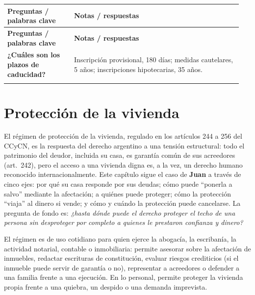 \documentclass[12pt,oneside]{book}
\makeatletter
\newenvironment{cornell}{%
    \par\vspace{0.5em}
    \noindent
    \begin{longtable}{@{}>{\raggedright\arraybackslash}p{0.27\linewidth}
                         >{\raggedright\arraybackslash}p{0.68\linewidth}@{}}
    \toprule
    \textbf{Preguntas / palabras clave} & \textbf{Notas / respuestas} \\
    \midrule
    \endfirsthead
    \toprule
    \textbf{Preguntas / palabras clave} & \textbf{Notas / respuestas} \\
    \midrule
    \endhead
}{%
    \bottomrule
    \end{longtable}
}
\newcommand{\cornellsummary}[1]{%
    \midrule
    \multicolumn{2}{@{}p{\dimexpr0.95\linewidth+2\tabcolsep\relax}@{}}{%
        \vspace{0.2em}\textbf{Resumen:} #1\vspace{0.2em}} \\
}
\makeatother
\begin{document}
\begin{cornell}
\textbf{¿Cuáles son los plazos de caducidad?} &
Inscripción provisional, 180 días; medidas cautelares, 5 años; inscripciones hipotecarias, 35 años. \\

\cornellsummary{Los derechos reales inmobiliarios son absolutos y oponibles \textit{erga omnes}, lo que exige publicidad. La Ley 17.801 establece un sistema registral real, de inscripción y no convalidante, que descansa en ocho principios y cuya inscripción tiene efecto declarativo. El bloqueo registral protege el inmueble durante la vigencia del certificado y, si se inscribe dentro de los 45 días, la inscripción es retroactiva; fuera de ese plazo se pierde la retroactividad. Al profesional le corresponde vigilar estos plazos para prevenir daños irreparables.}
\end{cornell}

\chapter{Protección de la vivienda}\label{cap:vivienda}

El régimen de protección de la vivienda, regulado en los artículos 244 a 256 del CCyCN, es la respuesta del derecho argentino a una tensión estructural: todo el patrimonio del deudor, incluida su casa, es garantía común de sus acreedores (art.~242), pero el acceso a una vivienda digna es, a la vez, un derecho humano reconocido internacionalmente. Este capítulo sigue el caso de \textbf{Juan} a través de cinco ejes: por qué su casa responde por sus deudas; cómo puede ``ponerla a salvo'' mediante la afectación; a quiénes puede proteger; cómo la protección ``viaja'' al dinero si vende; y cómo y cuándo la protección puede cancelarse. La pregunta de fondo es: \textit{¿hasta dónde puede el derecho proteger el techo de una persona sin desproteger por completo a quienes le prestaron confianza y dinero?}

El régimen es de uso cotidiano para quien ejerce la abogacía, la escribanía, la actividad notarial, contable o inmobiliaria: permite asesorar sobre la afectación de inmuebles, redactar escrituras de constitución, evaluar riesgos crediticios (si el inmueble puede servir de garantía o no), representar a acreedores o defender a una familia frente a una ejecución. En lo personal, permite proteger la vivienda propia frente a una quiebra, un despido o una demanda imprevista.
\end{document}
